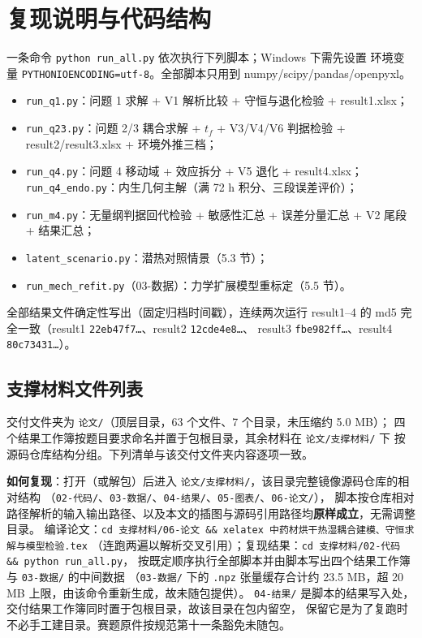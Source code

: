 \documentclass[12pt,a4paper]{ctexart}
\numberwithin{equation}{section}
\begin{document}
\section{复现说明与代码结构}
一条命令 \texttt{python run\_all.py} 依次执行下列脚本；Windows 下需先设置
环境变量 \texttt{PYTHONIOENCODING=utf-8}。全部脚本只用到
numpy/scipy/pandas/openpyxl。
\begin{itemize}
  \item \texttt{run\_q1.py}：问题 1 求解 + V1 解析比较 + 守恒与退化检验 + result1.xlsx；
  \item \texttt{run\_q23.py}：问题 2/3 耦合求解 + $t_f$ + V3/V4/V6 判据检验 +
        result2/result3.xlsx + 环境外推三档；
  \item \texttt{run\_q4.py}：问题 4 移动域 + 效应拆分 + V5 退化 + result4.xlsx；
        \texttt{run\_q4\_endo.py}：内生几何主解（满 72 h 积分、三段误差评价）；
  \item \texttt{run\_m4.py}：无量纲判据回代检验 + 敏感性汇总 + 误差分量汇总 +
        V2 尾段 + 结果汇总；
  \item \texttt{latent\_scenario.py}：潜热对照情景（5.3 节）；
  \item \texttt{run\_mech\_refit.py}（03-数据）：力学扩展模型重标定（5.5 节）。
\end{itemize}
全部结果文件确定性写出（固定归档时间戳），连续两次运行 result1--4 的 md5
完全一致（result1 \texttt{22eb47f7…}、result2 \texttt{12cde4e8…}、
result3 \texttt{fbe982ff…}、result4 \texttt{80c73431…}）。

\subsection*{支撑材料文件列表}
交付文件夹为 \texttt{论文/}（顶层目录，63 个文件、7 个目录，未压缩约 5.0 MB）；
四个结果工作簿按题目要求命名并置于包根目录，其余材料在 \texttt{论文/支撑材料/} 下
按源码仓库结构分组。下列清单与该交付文件夹内容逐项一致。

\textbf{如何复现}：打开（或解包）后进入 \texttt{论文/支撑材料/}，该目录完整镜像源码仓库的相对结构
（\texttt{02-代码/}、\texttt{03-数据/}、\texttt{04-结果/}、\texttt{05-图表/}、\texttt{06-论文/}），
脚本按仓库相对路径解析的输入输出路径、以及本文的插图与源码引用路径均\textbf{原样成立}，无需调整目录。
编译论文：\texttt{cd 支撑材料/06-论文 \&\& xelatex 中药材烘干热湿耦合建模、守恒求解与模型检验.tex}
（连跑两遍以解析交叉引用）；复现结果：\texttt{cd 支撑材料/02-代码 \&\& python run\_all.py}，
按既定顺序执行全部脚本并由脚本写出四个结果工作簿与 \texttt{03-数据/} 的中间数据
（\texttt{03-数据/} 下的 \texttt{.npz} 张量缓存合计约 23.5 MB，超 20 MB 上限，由该命令重新生成，故未随包提供）。
\texttt{04-结果/} 是脚本的结果写入处，交付结果工作簿同时置于包根目录，故该目录在包内留空，
保留它是为了复跑时不必手工建目录。赛题原件按规范第十一条豁免未随包。
\end{document}

